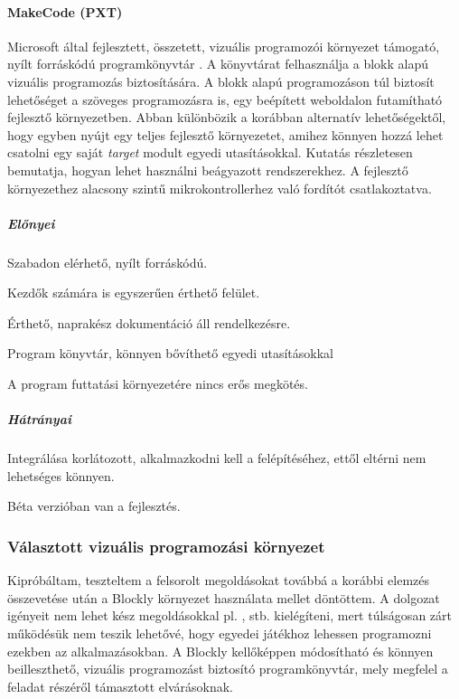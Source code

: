 \documentclass[12pt,a4paper,oneside]{report} %
\begin{document}
\paragraph{MakeCode (PXT)}
\label{pxt}
Microsoft által fejlesztett, összetett, vizuális programozói környezet támogató, nyílt forráskódú programkönyvtár \cite{seneviratne2019makecode}. A  könyvtárat felhasználja a blokk alapú vizuális programozás biztosítására. A blokk alapú programozáson túl biztosít lehetőséget a szöveges programozásra is, egy beépített weboldalon futamítható fejlesztő környezetben. Abban különbözik a korábban alternatív lehetőségektől, hogy egyben nyújt egy teljes fejlesztő környezetet, amihez könnyen hozzá lehet csatolni egy saját \textit{target} modult egyedi utasításokkal. \cite{devine2018makecode} Kutatás részletesen bemutatja, hogyan lehet használni beágyazott rendszerekhez. A fejlesztő környezethez alacsony szintű mikrokontrollerhez való fordítót csatlakoztatva.
\subparagraph{Előnyei} 
\begin{compactitem}
	\item Szabadon elérhető, nyílt forráskódú.
	\item Kezdők számára is egyszerűen érthető felület.
	\item Érthető, naprakész dokumentáció áll rendelkezésre.
	\item Program könyvtár, könnyen bővíthető egyedi utasításokkal
	\item A program futtatási környezetére nincs erős megkötés.
\end{compactitem}
\subparagraph{Hátrányai} 
\begin{compactitem}
	\item Integrálása korlátozott, alkalmazkodni kell a felépítéséhez, ettől eltérni nem lehetséges könnyen.
	\item Béta verzióban van a fejlesztés.
\end{compactitem}

\subsubsection{Választott vizuális programozási környezet}
Kipróbáltam, teszteltem a felsorolt megoldásokat továbbá a korábbi elemzés összevetése  után a Blockly környezet használata mellet döntöttem.
A dolgozat igényeit nem lehet kész megoldásokkal pl. ,  stb. kielégíteni, mert túlságosan zárt működésük nem teszik lehetővé, hogy egyedei játékhoz lehessen programozni ezekben az alkalmazásokban.
A Blockly kellőképpen módosítható és könnyen beilleszthető, vizuális programozást biztosító programkönyvtár, mely megfelel a feladat részéről támasztott elvárásoknak.
\end{document}
